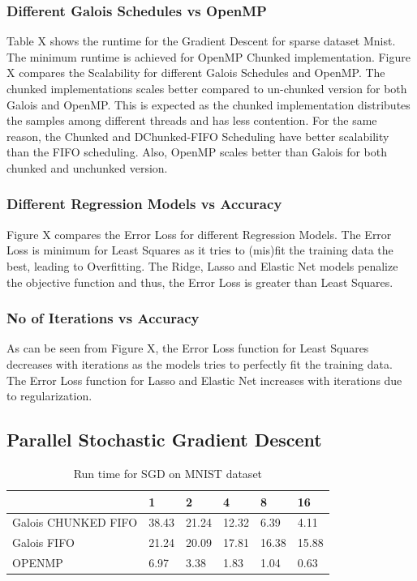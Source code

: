 \documentclass{sigplanconf}
\begin{document}
{	\subsubsection{Different Galois Schedules vs OpenMP}
	Table X shows the runtime for the Gradient Descent for sparse dataset Mnist. The minimum runtime is 
	achieved for OpenMP Chunked implementation. Figure X compares the Scalability for different Galois Schedules and OpenMP.
	The chunked implementations scales better compared to un-chunked version for both Galois and OpenMP. This is expected as the chunked
    	implementation distributes the samples among different threads and has less contention. For the same reason,
    	the Chunked and DChunked-FIFO Scheduling have better scalability than the FIFO scheduling. Also, OpenMP
    	scales better than Galois for both chunked and unchunked version.
     
    	\subsubsection{Different Regression Models vs Accuracy}
	Figure X compares the Error Loss for different Regression Models. The Error Loss is minimum for Least Squares
	as it tries to (mis)fit the training data the best, leading to Overfitting. The Ridge, Lasso and Elastic Net
	models penalize the objective function and thus, the Error Loss is greater than Least Squares. 
    
   	\subsubsection{No of Iterations vs Accuracy}
	As can be seen from Figure X, the Error Loss function for Least Squares decreases with iterations as the models
	tries to perfectly fit the training data. The Error Loss function for Lasso and Elastic Net increases with iterations
	due to regularization.

\subsection{Parallel Stochastic Gradient Descent}
\begin{table}[htbp]
\caption{Run time for SGD on MNIST dataset}
\begin{tabular}{|p{9em}|p{2em}|p{2em}|p{2em}|p{2em}|p{2em}|}
\hline
 & 1 & 2 & 4 & 8 & 16 \\ \hline
Galois CHUNKED FIFO & 38.43 & 21.24 & 12.32 & 6.39 & 4.11 \\ \hline
Galois FIFO & 21.24 & 20.09 & 17.81 & 16.38 & 15.88 \\ \hline
OPENMP & 6.97 & 3.38 & 1.83 & 1.04 & 0.63 \\ \hline
\end{tabular}
\label{Label of the table}
\end{table}

}
\end{document}
